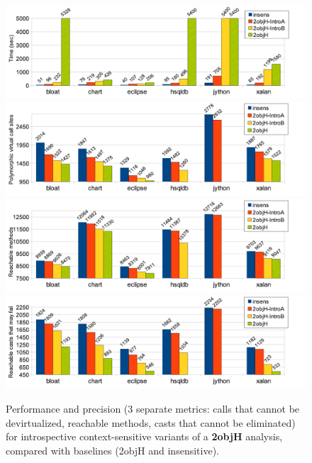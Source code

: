 \begin{figure}[h!tp]
\begin{center}
\includegraphics[scale=0.54]{assets/introspective/2objHtime.pdf} \\
\includegraphics[scale=0.54]{assets/introspective/2objHvcalls.pdf} \\
\includegraphics[scale=0.54]{assets/introspective/2objHmeths.pdf} \\
\includegraphics[scale=0.54]{assets/introspective/2objHcasts.pdf}
\end{center}
\caption{Performance and precision (3 separate metrics: calls that cannot be devirtualized, reachable methods, casts that cannot be eliminated) for introspective context-sensitive variants of a \textbf{2objH} analysis, compared with baselines (2objH and insensitive).}
\label{fig:introspect:2objH-chart}
\end{figure}


